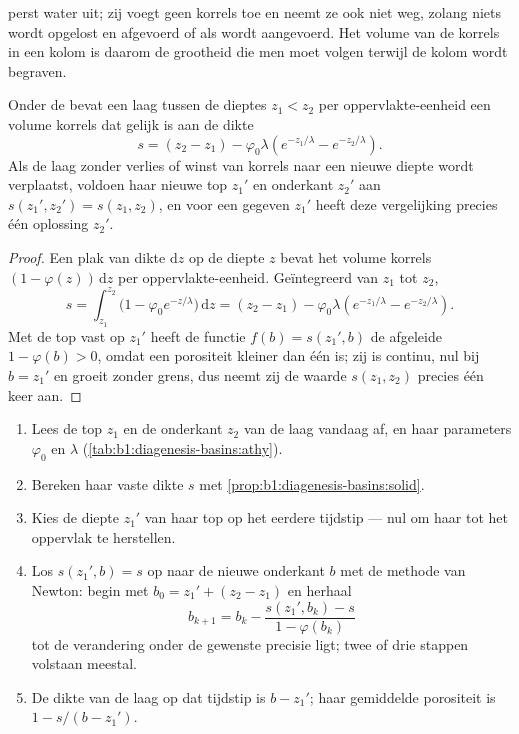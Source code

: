  perst water uit; zij voegt geen korrels toe en neemt ze ook niet weg, zolang niets wordt opgelost en afgevoerd of als  wordt aangevoerd. Het volume van de korrels in een kolom is daarom de grootheid die men moet volgen terwijl de kolom wordt begraven.

\begin{proposition}\label{prop:b1:diagenesis-basins:solid}
Onder de  bevat een laag tussen de dieptes $z_1 < z_2$ per oppervlakte-eenheid een
volume korrels dat gelijk is aan de dikte
\[
  s = (z_2 - z_1) - \varphi_0 \lambda \left( e^{-z_1/\lambda} - e^{-z_2/\lambda} \right).
\]
Als de laag zonder verlies of winst van korrels naar een nieuwe diepte wordt verplaatst, voldoen haar nieuwe top
$z_1'$ en onderkant $z_2'$ aan $s(z_1', z_2') = s(z_1, z_2)$, en voor een gegeven
$z_1'$ heeft deze vergelijking precies één oplossing $z_2'$.
\end{proposition}

\begin{proof}
Een plak van dikte $\mathrm dz$ op de diepte $z$ bevat het volume korrels
$(1 - \varphi(z))\,\mathrm dz$ per oppervlakte-eenheid. Geïntegreerd van $z_1$ tot $z_2$,
\[
  s = \int_{z_1}^{z_2} \bigl(1 - \varphi_0 e^{-z/\lambda}\bigr)\,\mathrm dz
    = (z_2 - z_1) - \varphi_0\lambda\left(e^{-z_1/\lambda} - e^{-z_2/\lambda}\right).
\]
Met de top vast op $z_1'$ heeft de functie $f(b) = s(z_1', b)$ de
afgeleide $1 - \varphi(b) > 0$, omdat een porositeit kleiner dan één is; zij is
continu, nul bij $b = z_1'$ en groeit zonder grens, dus neemt zij de waarde
$s(z_1, z_2)$ precies één keer aan.
\end{proof}

\begin{method}\label{met:b1:diagenesis-basins:decompaction}
\begin{enumerate}
  \item Lees de top $z_1$ en de onderkant $z_2$ van de laag vandaag af, en haar parameters $\varphi_0$ en $\lambda$
        (\cref{tab:b1:diagenesis-basins:athy}).
  \item Bereken haar vaste dikte $s$ met
        \cref{prop:b1:diagenesis-basins:solid}.
  \item Kies de diepte $z_1'$ van haar top op het eerdere tijdstip --- nul om haar tot het oppervlak te herstellen.
  \item Los $s(z_1', b) = s$ op naar de nieuwe onderkant $b$ met de methode van Newton: begin met $b_0 = z_1' + (z_2 - z_1)$ en herhaal
        \[
          b_{k+1} = b_k - \frac{s(z_1', b_k) - s}{1 - \varphi(b_k)}
        \]
        tot de verandering onder de gewenste precisie ligt; twee of drie stappen volstaan meestal.
  \item De dikte van de laag op dat tijdstip is $b - z_1'$; haar gemiddelde
        porositeit is $1 - s/(b - z_1')$.
\end{enumerate}
\end{method}

